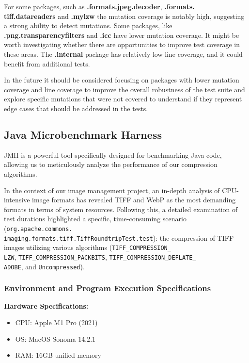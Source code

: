 \documentclass[sigconf]{acmart}
\begin{document}
For some packages, such as \textbf{.formats.jpeg.decoder}, \textbf{.formats.
tiff.datareaders} and \textbf{.mylzw} the mutation coverage is notably high, suggesting a strong ability to detect mutations.
Some packages, like 
\textbf{.png.transparencyfilters} and \textbf{.icc} have lower mutation coverage. It might be worth investigating whether there are opportunities to improve test coverage in these areas.
The \textbf{.internal} package has relatively low line coverage, and it could benefit from additional tests.

In the future it should be considered focusing on packages with lower mutation coverage and line coverage to improve the overall robustness of the test suite and explore specific mutations that were not covered to understand if they represent edge cases that should be addressed in the tests.



\subsection{Java Microbenchmark Harness}
JMH\cite{jmh} is a powerful tool specifically designed for benchmarking Java code, allowing us to meticulously analyze the performance of our compression algorithms.

In the context of our image management project, an in-depth analysis of CPU-intensive image formats has revealed TIFF and WebP as the most demanding formats in terms of system resources. Following this, a detailed examination of test durations highlighted a specific, time-consuming scenario (\texttt{org.apache.commons.\\imaging.formats.tiff.TiffRoundtripTest.test}): the compression of TIFF images utilizing various algorithms (\texttt{TIFF\_COMPRESSION\_\\LZW}, \texttt{TIFF\_COMPRESSION\_PACKBITS}, \texttt{TIFF\_COMPRESSION\_DEFLATE\_\\ADOBE}, and \texttt{Uncompressed}).

\subsubsection{Environment and Program Execution Specifications}

\textbf{Hardware Specifications:}
\begin{itemize}
  \item CPU: Apple M1 Pro (2021)
  \item OS: MacOS Sonoma 14.2.1
  \item RAM: 16GB unified memory
\end{itemize}
\end{document}
